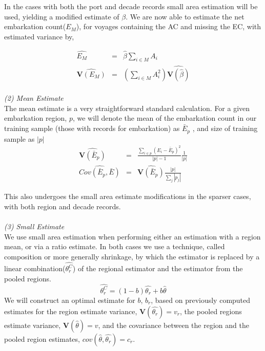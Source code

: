 \documentclass{article}
\begin{document}
In the cases with both the port and decade records small area
estimation will be used, yielding a modified estimate of $\beta$.
We are now able to estimate the net embarkation count($E_M$), for voyages containing the AC and
missing the EC, with estimated variance by,

\begin{eqnarray}
\hat{E_M} &=& \hat{\beta} \sum_{i \in M} A_i\\
\widehat{\mathbf{V}(E_M)} &=& ( \sum_{i \in M} A_i^2 ) \widehat{\mathbf{V}(\hat{\beta})}
\end{eqnarray}
\\
\textit{(2) Mean Estimate}\\
\indent
The mean estimate is a very straightforward standard calculation.  For a given embarkation region, $p$, we will denote the mean of the embarkation count in our training sample (those with  records for
embarkation) as $\bar{E}_p$ , and size of training sample as  $|p|$
\begin{eqnarray}
\widehat{\mathbf{V}(\bar{E}_p)} &=& \frac{\sum_{i \in p} (E_i - \bar{E}_p)^2}{|p|-1} \frac{1}{|p|}\\
\widehat{Cov(\bar{E}_p,\bar{E})} &=& \widehat{\mathbf{V}(\bar{E}_p)} \frac{|p|}{\sum_j |p_j|}
\end{eqnarray}
 
This also undergoes the small area estimate modifications in the
sparser cases, with both region and decade records.\\ 
\\
\textit{(3) Small Estimate}\\
\indent
We use small area estimation when performing either an estimation with
a region mean, or via a ratio estimate.
In both cases we use a technique, called composition or more generally shrinkage, by which the estimator is replaced by
a linear combination($\hat{\theta_r^C}$) of the regional estimator and the estimator from
the pooled regions.  
\begin{equation}
\hat{\theta_r^C} = (1 - b)\hat{\theta_r} + b \hat{\theta}
\end{equation}
\indent
We will construct an optimal estimate for $b$, $b_r$, based on
previously computed estimates for
the region estimate variance, $\mathbf{V}(\hat{\theta_r}) = v_r$, the pooled
regions estimate variance, $\mathbf{V}(\hat{\theta}) = v$, and the
covariance between the region and the pooled region estimates,
$cov(\hat{\theta},\hat{\theta_r}) = c_r$. 
\end{document}

